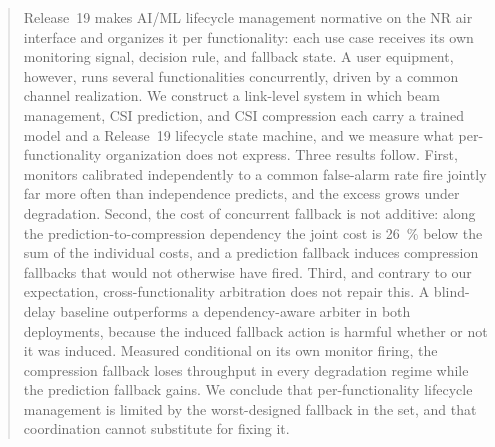 %
%
%

\begin{abstract}
Release~19 makes AI/ML lifecycle management normative on the NR air
interface and organizes it per functionality: each use case receives its
own monitoring signal, decision rule, and fallback state. A user equipment,
however, runs several functionalities concurrently, driven by a common
channel realization. We construct a link-level system in which beam
management, CSI prediction, and CSI compression each carry a trained model
and a Release~19 lifecycle state machine, and we measure what
per-functionality organization does not express. Three results follow.
First, monitors calibrated independently to a common false-alarm rate fire
jointly far more often than independence predicts, and the excess grows
under degradation. Second, the cost of concurrent fallback is not additive:
along the prediction-to-compression dependency the joint cost is
\SI{26}{\percent} below the sum of the individual costs, and a prediction
fallback induces compression fallbacks that would not otherwise have fired.
Third, and contrary to our expectation, cross-functionality arbitration does
not repair this. A blind-delay baseline outperforms a dependency-aware
arbiter in both deployments, because the induced fallback action is harmful
whether or not it was induced. Measured conditional on its own monitor
firing, the compression fallback loses throughput in every degradation
regime while the prediction fallback gains. We conclude that
per-functionality lifecycle management is limited by the worst-designed
fallback in the set, and that coordination cannot substitute for fixing it.
\end{abstract}

